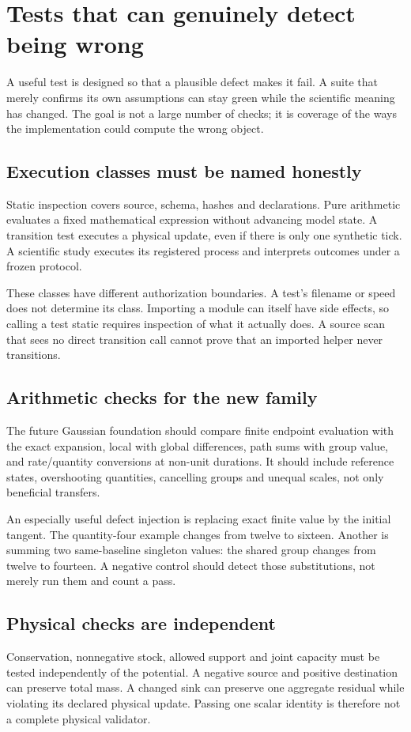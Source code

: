 \chapter{Tests that can genuinely detect being wrong}\label{ch:testing}
A useful test is designed so that a plausible defect makes it fail. A
suite that merely confirms its own assumptions can stay green while the
scientific meaning has changed. The goal is not a large number of checks;
it is coverage of the ways the implementation could compute the wrong object.

\section{Execution classes must be named honestly}
Static inspection covers source, schema, hashes and declarations. Pure
arithmetic evaluates a fixed mathematical expression without advancing
model state. A transition test executes a physical update, even if there
is only one synthetic tick. A scientific study executes its registered
process and interprets outcomes under a frozen protocol.

These classes have different authorization boundaries. A test's filename
or speed does not determine its class. Importing a module can itself have
side effects, so calling a test static requires inspection of what it actually
does. A source scan that sees no direct transition call cannot prove that
an imported helper never transitions.

\section{Arithmetic checks for the new family}
The future Gaussian foundation should compare finite endpoint evaluation
with the exact expansion, local with global differences, path sums with
group value, and rate/quantity conversions at non-unit durations. It should
include reference states, overshooting quantities, cancelling groups and
unequal scales, not only beneficial transfers.

An especially useful defect injection is replacing exact finite value by
the initial tangent. The quantity-four example changes from twelve to
sixteen. Another is summing two same-baseline singleton values: the shared
group changes from twelve to fourteen. A negative control should detect
those substitutions, not merely run them and count a pass.

\section{Physical checks are independent}
Conservation, nonnegative stock, allowed support and joint capacity must be
tested independently of the potential. A negative source and positive
destination can preserve total mass. A changed sink can preserve one
aggregate residual while violating its declared physical update. Passing
one scalar identity is therefore not a complete physical validator.

